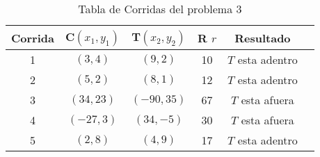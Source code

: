 \begin{table}[h!]
     \centering
     \caption{Tabla de Corridas del problema 3}

     \begin{tabular}{|c|c|c|c|c|c|}
     \hline
    Corrida & C$(x_{1}, y_{1})$& T$(x_{2}, y_{2})$  &  R $r$ & Resultado\\
    \hline
    1  &  $(3,4)$ & $(9,2)$ & 10 & $T$ esta adentro \\
    \hline
    2  &  $(5,2)$ & $(8,1)$ & 12 & $T$ esta adentro \\
    \hline
    3  &  $(34,23)$ & $(-90,35)$ & 67 & $T$ esta afuera \\
    \hline
    4  &  $(-27,3)$ & $(34,-5)$ & 30 & $T$ esta afuera \\
    \hline
    5 &  $(2,8)$ & $(4,9)$ & 17 & $T$ esta adentro \\
    \hline
     \end{tabular}
     \label{tab:my_label}
 \end{table}
